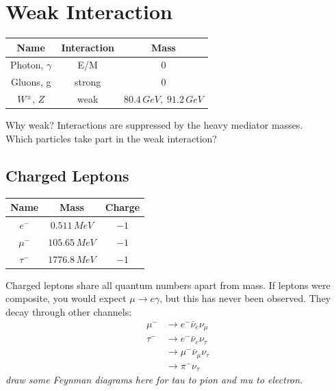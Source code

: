\documentclass[a4paper, 11pt, normalem]{report}
\begin{document}
\section{Weak Interaction}
\begin{center}
    \begin{tabular}{c|c|c}
        Name & Interaction & Mass \\
        \hline
        Photon, $\gamma$ & E/M & 0 \\
        Gluons, g & strong & 0 \\
        $W^{\pm},\,Z$ & weak & $80.4\,GeV,\; 91.2\,GeV$
    \end{tabular}
\end{center}
Why weak?
Interactions are suppressed by the heavy mediator masses.\\
Which particles take part in the weak interaction?

\subsection{Charged Leptons}
\begin{center}
    \begin{tabular}{c|c|c}
        Name & Mass & Charge \\
        \hline
        $e^-$ & $0.511\,MeV$ & $-1$ \\
        $\mu^-$ & $105.65\,MeV$ & $-1$ \\
        $\tau^-$ & $1776.8\,MeV$ & $-1$
    \end{tabular}
\end{center}
Charged leptons share all quantum numbers apart from mass.
If leptons were composite, you would expect $\mu \to e\gamma$, but this has never been observed.
They decay through other channels:
\begin{align}
    \mu^- &\to e^-\bar{\nu}_e\nu_\mu \\
    \tau^- &\to e^-\bar{\nu}_e\nu_\tau \\
           &\to \mu^-\bar{\nu}_\mu\nu_\tau \\
           &\to \pi^-\nu_\tau
\end{align}
\textit{draw some Feynman diagrams here for tau to pion and mu to electron.}
\end{document}
